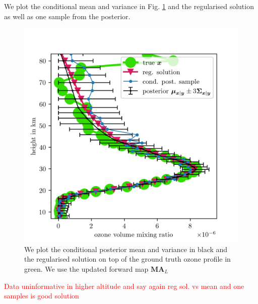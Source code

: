 We plot the conditional mean and variance in Fig. \ref{fig:O3SolplsReg} and the regularised solution as well as one sample from the posterior.
\begin{figure}[ht!]
	\centering
	\includegraphics{SecRecResinclRegandSampl.png}
	\caption[Ozone posterior mean and variance and the regularised solution compared to the ground truth.]{We plot the conditional posterior mean and variance in black and the regularised solution on top of the ground truth ozone profile in green. We use the updated forward map $\bm{M}\bm{A}_L$}
	\label{fig:O3SolplsReg}
\end{figure}

\textcolor{red}{Data uninformative in higher altitude and say again reg sol. vs mean and one samples is good solution }


